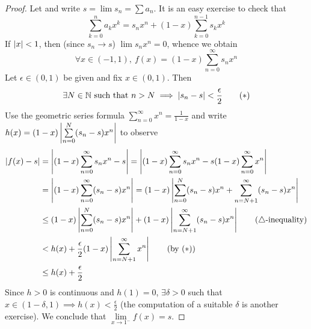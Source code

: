 \begin{proof}
Let  and write $s=\lim s_n=\sum a_n$. It is an easy exercise to check that
\[\sum_{k=0}^na_kx^k =s_nx^n+(1-x)\sum_{k=0}^{n-1}s_kx^k\]
If $\left| x\right|<1$, then (since $s_n\to s$) $\lim s_nx^n=0$, whence we obtain
\[\forall x\in(-1,1),\ f(x)=(1-x)\sum_{n=0}^{\infty}s_nx^n\]
Let $\epsilon\in(0,1)$ be given and fix $x\in(0,1)$. Then
\[\exists N\in\mathbb{N}\text{ such that }n>N\implies \left| s_n-s\right|<\frac\epsilon 2 \tag{$\ast$}\]
Use the geometric series formula $\sum\limits_{n=0}^{\infty}x^n=\frac 1{1-x}$ and write $h(x)=(1-x)\left| \sum\limits_{n=0}^N(s_n-s)x^n\right|$ to observe
\begin{align*}
\left| f(x)-s\right|&=\left| (1-x)\sum_{n=0}^{\infty}s_nx^n-s\right| =\left| (1-x)\sum_{n=0}^{\infty}s_nx^n-s(1-x)\sum_{n=0}^{\infty}x^n\right|\\
&=\left| (1-x)\sum_{n=0}^{\infty}(s_n-s)x^n\right| =(1-x)\left| \sum_{n=0}^N(s_n-s)x^n+\sum_{n=N+1}^\infty(s_n-s)x^n\right|\\
&\le (1-x)\left| \sum_{n=0}^N(s_n-s)x^n\right|+ (1-x)\left| \sum_{n=N+1}^\infty(s_n-s)x^n\right| \tag{$\triangle$-inequality}\\
&<h(x)+ \frac\epsilon 2(1-x)\left| \sum_{n=N+1}^\infty x^n\right| \tag{by ($\ast$)}\\
&\le h(x)+ \frac\epsilon 2
\end{align*}
Since $h>0$ is continuous and $h(1)=0$, $\exists \delta>0$ such that $x\in(1-\delta,1)\implies h(x)<\frac\epsilon 2$ (the computation of a suitable $\delta$ is another exercise).\medbreak
We conclude that $\lim\limits_{x\to 1^-}f(x)=s$.
\end{proof}


